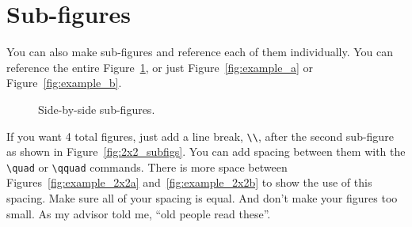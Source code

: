 \documentclass[12pt]{report}
\begin{document}
\section{Sub-figures}
You can also make sub-figures and reference each of them individually.  You can reference the entire Figure~\ref{fig:1x2_subfigs}, or just Figure~\ref{fig:example_a} or Figure~\ref{fig:example_b}.
\begin{figure}[!ht]
  \centering
   \caption{Side-by-side sub-figures.}
\label{fig:1x2_subfigs}
\end{figure}


If you want 4 total figures, just add a line break, \verb'\\', after the second sub-figure as shown in Figure~\ref{fig:2x2_subfigs}.  You can add spacing between them with the \verb'\quad' or \verb'\qquad' commands.  There is more space between Figures~\ref{fig:example_2x2a} and~\ref{fig:example_2x2b} to show the use of this spacing.  Make sure all of your spacing is equal.  And don't make your figures too small.  As my advisor told me, ``old people read these''\cite{Mark}.
\end{document}
